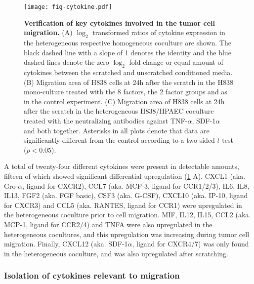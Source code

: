 \begin{figure}
\begin{center}
\texttt{[image: fig-cytokine.pdf]}
\end{center}
\caption[Verification of key cytokines]{
{\bf Verification of key cytokines involved in the tumor cell migration.} 
(A) $\log_2$ transformed ratios of cytokine expression in the heterogeneous respective
homogeneous coculture are shown. The black dashed line with a slope of 1 denotes 
the identity and the blue dashed lines denote the zero $\log_2$ fold change
or equal amount of cytokines between the scratched and unscratched conditioned 
media.
(B) Migration area of H838 cells at 24h after the scratch in the H838 mono-culture 
treated with the 8
factors, the 2 factor groups and as in the control experiment.
(C) Migration area of H838 cells at 24h after the scratch in the heterogeneous 
H838/HPAEC coculture 
treated with the neutralizing antibodies against TNF-$\alpha$, SDF-1$\alpha$
and both together. Asterisks in all plots denote that data are significantly 
different from the control according to a two-sided $t$-test ($p < 0.05$).
}
\label{fig:cytokine}
\end{figure}

A total of twenty-four different cytokines were present in detectable amounts,
fifteen of which showed significant differential upregulation
(\ref{fig:cytokine} A).
CXCL1 (aka. Gro-$\alpha$, ligand for CXCR2), CCL7 (aka. MCP-3, ligand for CCR1/2/3), IL6, IL8, IL13, FGF2 (aka. FGF basic), CSF3 (aka. G-CSF), CXCL10 (aka. IP-10, ligand for CXCR3) and CCL5 (aka. RANTES, ligand for CCR1) were
upregulated in the heterogeneous coculture prior to cell migration.
MIF, IL12, IL15, CCL2 (aka. MCP-1, ligand for CCR2/4) and TNFA were also upregulated
in the heterogeneous cocultures, and this upregulation was increasing
during tumor cell migration.
Finally, CXCL12 (aka. SDF-1$\alpha$, ligand for CXCR4/7) was only found in the heterogeneous coculture,
and was also upregulated after scratching. 

\subsubsection{Isolation of cytokines relevant to migration}

